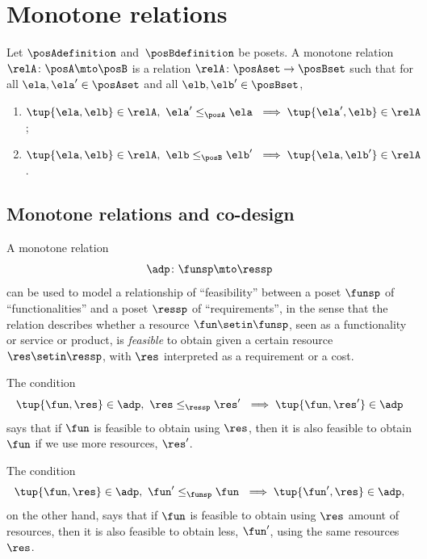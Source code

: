 \section{Monotone relations}


\begin{definition}
    Let $\posAdefinition$ and~$\posBdefinition$ be posets. A monotone relation $\relA \colon \posA \mto \posB$ is a relation $\relA \colon \posAset \to \posBset$ such that for all $\ela, \ela' \in \posAset$ and all $\elb, \elb' \in \posBset$,
    \begin{enumerate}
        \item $\tup{\ela, \elb} \in \relA, \ \ela' \leq_{\posA} \ela \ \implies \tup{\ela', \elb} \in \relA$;
        \item $\tup{\ela, \elb} \in \relA, \ \elb \leq_{\posB} \elb' \ \implies \tup{\ela, \elb'} \in \relA$.
    \end{enumerate}
\end{definition}

\subsection{Monotone relations and co-design}

A monotone relation
\begin{equation}
    \adp \colon \funsp \mto \ressp
\end{equation}
can be used to model a relationship of ``feasibility'' between a poset $\funsp$ of ``functionalities'' and a poset $\ressp$ of ``requirements'', in the sense that the relation describes whether a resource $\fun \setin \funsp$, seen as a functionality or service or product, is \emph{feasible} to obtain given a certain resource $\res \setin \ressp$, with $\res$ interpreted as a requirement or a cost.

The condition
\begin{equation}
    \tup{\fun, \res} \in \adp, \ \res \leq_{\ressp} \res' \ \implies \tup{\fun, \res'} \in \adp
\end{equation}
says that if $\fun$ is feasible to obtain using $\res$, then it is also feasible to obtain $\fun$ if we use more resources, $\res'$.

The condition
\begin{equation}
    \tup{\fun, \res} \in \adp, \ \fun' \leq_{\funsp} \fun \ \implies \tup{\fun', \res} \in \adp,
\end{equation}
on the other hand, says that if $\fun$ is feasible to obtain using $\res$ amount of resources, then it is also feasible to obtain less, $\fun'$, using the same resources $\res$.